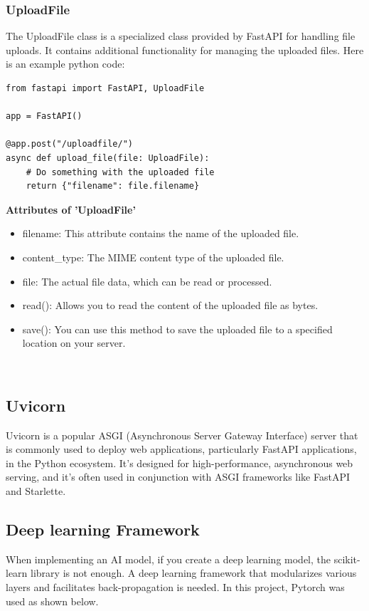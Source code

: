 \subsubsection{\textbf{UploadFile}}
The UploadFile class is a specialized class provided by FastAPI for handling file uploads. It contains additional functionality for managing the uploaded files. Here is an example python code:
\begin{verbatim}
from fastapi import FastAPI, UploadFile

app = FastAPI()

@app.post("/uploadfile/")
async def upload_file(file: UploadFile):
    # Do something with the uploaded file
    return {"filename": file.filename}
\end{verbatim}
\textbf{Attributes of 'UploadFile'}
\begin{itemize}
    \item filename: This attribute contains the name of the uploaded file.
    \item content\_type: The MIME content type of the uploaded file.
    \item file: The actual file data, which can be read or processed.
    \item read(): Allows you to read the content of the uploaded file as bytes.
    \item save(): You can use this method to save the uploaded file to a specified location on your server.
\end{itemize}
\\
\subsection{\textbf{Uvicorn}}
Uvicorn is a popular ASGI (Asynchronous Server Gateway Interface) server that is commonly used to deploy web applications, particularly FastAPI applications, in the Python ecosystem. It's designed for high-performance, asynchronous web serving, and it's often used in conjunction with ASGI frameworks like FastAPI and Starlette.


\subsection{\textbf{Deep learning Framework}}
When implementing an AI model, if you create a deep learning model, the scikit-learn library is not enough. A deep learning framework that modularizes various layers and facilitates back-propagation is needed. In this project, Pytorch was used as shown below.\\
